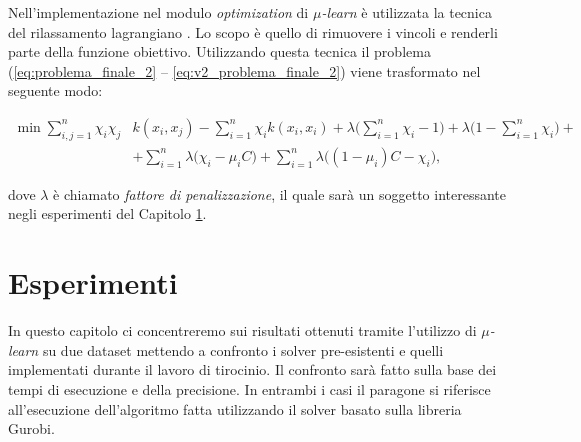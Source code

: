 \documentclass[a4paper,12pt]{report}
\begin{document}
Nell'implementazione nel modulo \textit{optimization} di \textit{$\mu$-learn} \cite{mulearn_documentation} è utilizzata la tecnica del rilassamento lagrangiano \cite{lagrangian_relaxation}. Lo scopo è quello di rimuovere i vincoli e renderli parte della funzione obiettivo. Utilizzando questa tecnica il problema (\ref{eq:problema_finale_2} -- \ref{eq:v2_problema_finale_2}) viene trasformato nel seguente modo:

\begin{equation*}
    \begin{split}
        \min \displaystyle\sum_{i,j=1}^{n}\chi_i\chi_j &k(x_i,x_j) - \displaystyle\sum_{i=1}^{n}\chi_ik(x_i,x_i)+ \lambda\Big(\displaystyle\sum_{i=1}^{n}\chi_i -1\Big) + \lambda\Big(1 - \displaystyle\sum_{i=1}^{n}\chi_i\Big) + \\
        &+ \displaystyle\sum_{i=1}^{n}\lambda\Big(\chi_i-\mu_iC\Big) + \displaystyle\sum_{i=1}^{n}\lambda\Big((1 -\mu_i)C - \chi_i\Big),       
    \end{split}
\end{equation*}

\noindent dove $\lambda$ è chiamato \textit{fattore di penalizzazione}, il quale sarà un soggetto interessante negli esperimenti del Capitolo \ref{Captiolo 3}.


%

\chapter{Esperimenti}
\label{Captiolo 3}
In questo capitolo ci concentreremo sui risultati ottenuti tramite l'utilizzo di \textit{$\mu$-learn} su due dataset mettendo a confronto i solver pre-esistenti e quelli implementati durante il lavoro di tirocinio. Il confronto sarà fatto sulla base dei tempi di esecuzione e della precisione. In entrambi i casi il paragone si riferisce all'esecuzione dell'algoritmo fatta utilizzando il solver basato sulla libreria Gurobi.

\end{document}
